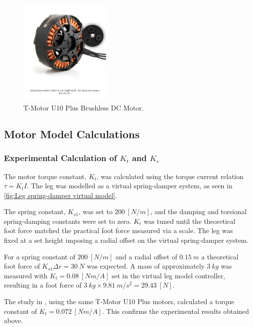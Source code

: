 \begin{figure}
\centering
\includegraphics[clip, trim=0cm 5cm 0cm 2cm, width=0.4\textwidth]{images/motor/TMotorU10Plus} 
\caption{T-Motor U10 Plus Brushless DC Motor.}
\label{fig:TMotorU10Plus}
\end{figure}

\subsection{Motor Model Calculations}

\subsubsection{Experimental Calculation of $K_t$ and $K_e$}
The motor torque constant, $K_t$, was calculated using the torque current relation $\tau = K_tI$. The leg was modelled as a virtual spring-damper system, as seen in \cref{fig:Leg spring-damper virtual model}. 

The spring constant, $K_{s1}$, was set to $200\ [N/m]$, and the damping and torsional spring-damping constants were set to zero. $K_t$ was tuned until the theoretical foot force matched the practical foot force measured via a scale. The leg was fixed at a set height imposing a radial offset on the virtual spring-damper system.

For a spring constant of $200\ [N/m]$ and a radial offset of $0.15\ m$ a theoretical foot force of $K_{s1}\Delta r = 30\ N$ was expected. A mass of approximately $3\ kg$ was measured with $K_t = 0.08\ [Nm/A]$ set in the virtual leg model controller, resulting in a foot force of $3\ kg \times 9.81\ m/s^2 = 29.43\ [N]$. 

The study in \cite{Kalouche2016}, using the same T-Motor U10 Plus motors, calculated a torque constant of $K_t =  0.072\ [Nm/A]$. This confirms the experimental results obtained above.

